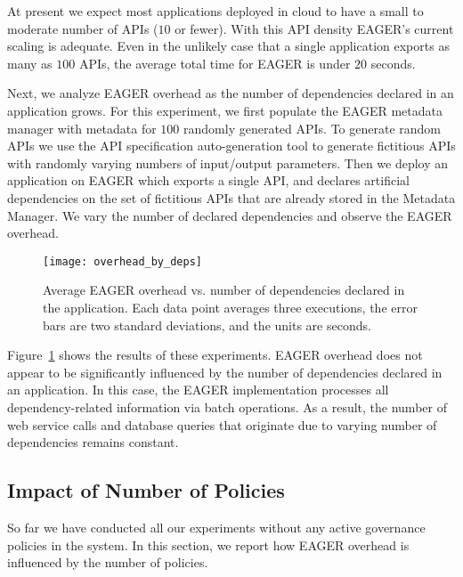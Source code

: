 At present we expect most applications deployed in cloud to have a small to 
moderate number of APIs ($10$ or fewer).  With this API density EAGER's current 
scaling is adequate.  Even in the
unlikely case that a single application exports as many as $100$ APIs,
the average total time for EAGER is under $20$ seconds.

Next, we analyze EAGER overhead as the number of dependencies declared in
an application grows. For this experiment, we first populate the EAGER
metadata manager with metadata for $100$ randomly 
generated APIs. To generate random APIs we use the API specification
auto-generation tool to generate
fictitious APIs with randomly varying numbers of input/output parameters.
Then we
deploy an application on EAGER which exports a single API, and declares
artificial dependencies on the set of fictitious 
APIs that are already stored in the Metadata Manager. We
vary the number of declared dependencies and observe the EAGER overhead.

\begin{figure}
\centering
\texttt{[image: overhead\_by\_deps]}
\caption{Average EAGER overhead vs. number of dependencies declared in the
application.  Each data point averages three executions, the error bars are
two standard deviations, and the units are seconds.}
\label{fig:overhead_by_deps}
\end{figure}

Figure~\ref{fig:overhead_by_deps} shows the results of these experiments. 
EAGER overhead does not appear to be significantly
influenced by the number of dependencies declared in an application. 
In this case, the EAGER implementation processes
all dependency-related information via batch operations. 
As a result, the number of web service calls and database queries that originate 
due to varying number of dependencies remains constant. 

\subsection{Impact of Number of Policies}

So far we have conducted all our experiments without any active governance 
policies in the system. In this section, we report how EAGER overhead
is influenced by the number of policies.

